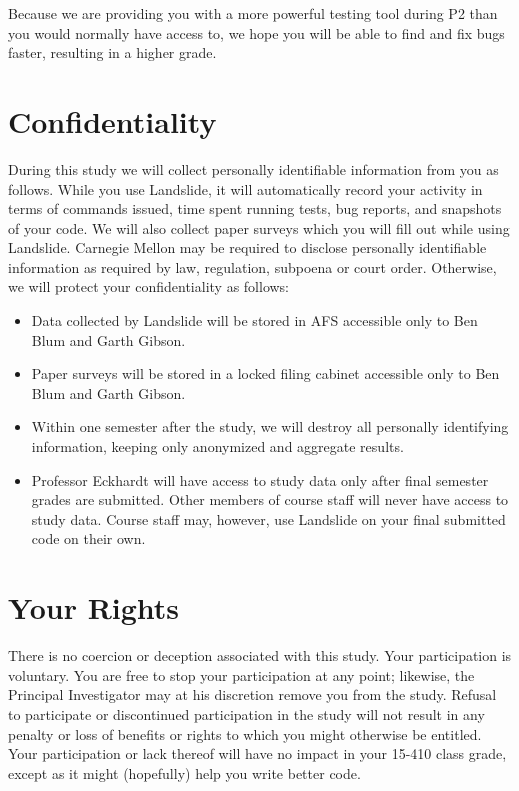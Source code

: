 \documentclass{article}
\begin{document}
Because we are providing you with a more powerful testing tool during P2 than you would normally have access to, we hope you will be able to find and fix bugs faster, resulting in a higher grade.

\section{Confidentiality}

During this study we will collect personally identifiable information from you as follows. While you use Landslide, it will automatically record your activity in terms of commands issued, time spent running tests, bug reports, and snapshots of your code. We will also collect paper surveys which you will fill out while using Landslide.
Carnegie Mellon may be required to disclose personally identifiable information as required by law, regulation, subpoena or court order.
Otherwise, we will protect your confidentiality as follows:

\begin{itemize}
	\item Data collected by Landslide will be stored in AFS accessible only to Ben Blum and Garth Gibson.
	\item Paper surveys will be stored in a locked filing cabinet accessible only to Ben Blum and Garth Gibson.
	\item Within one semester after the study, we will destroy all personally identifying information, keeping only anonymized and aggregate results.
	\item Professor Eckhardt will have access to study data only after final semester grades are submitted. Other members of course staff will never have access to study data. Course staff may, however, use Landslide on your final submitted code on their own.
\end{itemize}

\section{Your Rights}
There is no coercion or deception associated with this study.
Your participation is voluntary.
You are free to stop your participation at any point; likewise, the Principal Investigator may at his discretion remove you from the study.
Refusal to participate or discontinued participation in the study will not result in any penalty or loss of benefits or rights to which you might otherwise be entitled.
Your participation or lack thereof will have no impact in your 15-410 class grade, except as it might (hopefully) help you write better code.
\\
\end{document}
